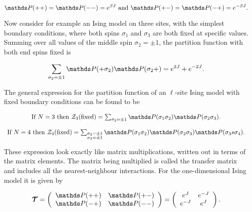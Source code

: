 \documentclass{homework}
\begin{document}
\begin{equation}
    \prob(++) = \prob(--) = e^{\beta J} \textnormal{  and  } \prob(+-) = \prob(-+) = e^{-\beta J}.
\end{equation}

Now consider for example an Ising model on three sites, with the simplest boundary conditions, where both spins $\sigma_1$ and $\sigma_3$ are both fixed at specific values. Summing over all values of the middle spin $\sigma_2 = \pm 1$, the partition function with both end spins fixed is 

\begin{equation}
    \sum_{\sigma_2 = \pm 1} \prob(+\sigma_2) \prob(\sigma_2+) = e^{2J} + e^{-2J}.
\end{equation}

The general expression for the partition function of an $\ell$-site Ising model with fixed boundary conditions can be found to be 

\begin{equation*}
    \begin{array}{c}
        \textnormal{If $N = 3$ then } \mathcal{Z}_3(\textnormal{fixed}) = \sum_{\sigma_2 = \pm 1} \prob(\sigma_1\sigma_2) \prob(\sigma_2\sigma_3).  \\
        \\
        \textnormal{If $N = 4$ then } \mathcal{Z}_4(\textnormal{fixed}) = \sum_{\substack{\sigma_2 = \pm 1\\
    \sigma_3 = \pm 1}} \prob(\sigma_1\sigma_2) \prob(\sigma_2\sigma_3) \prob(\sigma_3s\sigma_4). \\
    \end{array}
\end{equation*}

These expression look exactly like matrix multiplications, written out in terms of the matrix elements. The matrix being multiplied is called the transfer matrix and includes all the nearest-neighbour interactions. For the one-dimensional Ising model it is given by 

\begin{equation}
    \bm{\mathcal{T}} = \left( \begin{array}{cc}
        \prob(++) & \prob(+-) \\
         \prob(-+) &  \prob(--)
    \end{array} \right) = \left(\begin{array}{cc}
        e^J & e^{-J}  \\
        e^{-J} & e^J
    \end{array}\right).
\end{equation}
\end{document}
